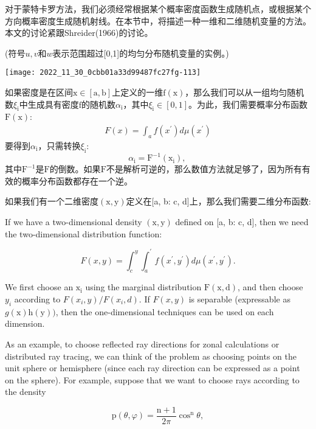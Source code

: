 \begin{CJK}{UTF8}{gbsn}
对于蒙特卡罗方法，我们必须经常根据某个概率密度函数生成随机点，或根据某个方向概率密度生成随机射线。在本节中，将描述一种一维和二维随机变量的方法。本文的讨论紧跟Shreider(1966)的讨论。

\begin{table}[htbp]
\small{\caption{(符号$u, v$和$w$表示范围超过[0,1]的均匀分布随机变量的实例。)}}
\centering
\texttt{[image: 2022\_11\_30\_0cbb01a33d99487fc27fg-113]}
\end{table}

如果密度是在区间$\mathrm{x} \in[\mathrm{a}, \mathrm{b}]$上定义的一维$\mathrm{f}(\mathrm{x})$，那么我们可以从一组均匀随机数$\xi_{\mathrm{i}}$中生成具有密度$\mathrm{f}$的随机数$\alpha_{\mathrm{i}}$，其中$\xi_{\mathrm{i}} \in[0,1]$。为此，我们需要概率分布函数$\mathrm{F}(\mathrm{x})$:
\begin{align}
F(x)=\int_{a} f\left(x^{\prime}\right) d \mu\left(x^{\prime}\right)
\end{align}
要得到$\alpha_{\mathrm{i}}$，只需转换$\xi_{\mathrm{i}}$:
$$
\alpha_{\mathrm{i}}=\mathrm{F}^{-1}\left(\mathrm{x}_{\mathrm{i}}\right) \text {, }
$$
其中$\mathrm{F}^{-1}$是$\mathrm{F}$的倒数。如果$\mathrm{F}$不是解析可逆的，那么数值方法就足够了，因为所有有效的概率分布函数都存在一个逆。

如果我们有一个二维密度$(\mathrm{x}, \mathrm{y})$定义在[a, b: c, d]上，那么我们需要二维分布函数:

If we have a two-dimensional density $(\mathrm{x}, \mathrm{y})$ defined on [a, b: c, d], then we need the two-dimensional distribution function:

$$
F(x, y)=\int_{c}^{y} \int_{a}^{\prime} f\left(x^{\prime}, y^{\prime}\right) d \mu\left(x^{\prime}, y^{\prime}\right) .
$$

We first choose an $\mathrm{x}_{\mathrm{i}}$ using the marginal distribution $\mathrm{F}(\mathrm{x}, \mathrm{d})$, and then choose $y_{i}$ according to $F\left(x_{i}, y\right) / F\left(x_{i}, d\right)$. If $F(x, y)$ is separable (expressable as $g(\mathrm{x}) \mathrm{h}(\mathrm{y}))$, then the one-dimensional techniques can be used on each dimension.

As an example, to choose reflected ray directions for zonal calculations or distributed ray tracing, we can think of the problem as choosing points on the unit sphere or hemisphere (since each ray direction can be expressed as a point on the sphere). For example, suppose that we want to choose rays according to the density

$$
\mathrm{p}(\theta, \varphi)=\frac{\mathrm{n}+1}{2 \pi} \cos ^{\mathrm{n}} \theta,
$$


\end{CJK}
